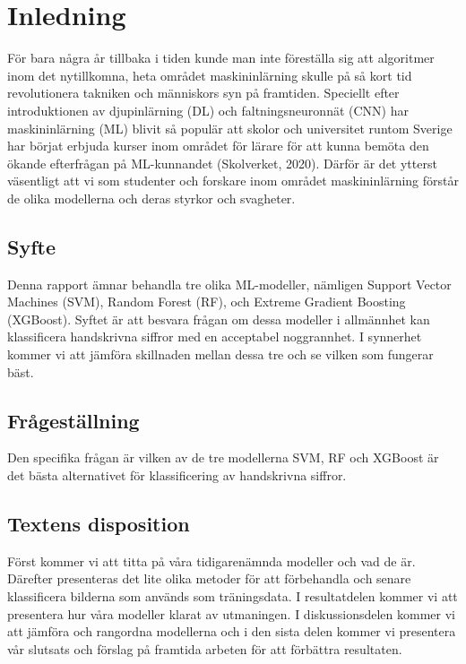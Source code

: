 \documentclass[12pt,a4paper]{article}
\begin{document}
\newpage

\section{Inledning}

För bara några år tillbaka i tiden kunde man inte föreställa sig att algoritmer inom det nytillkomna, heta området maskininlärning skulle på så kort tid revolutionera takniken och människors syn på framtiden. Speciellt efter introduktionen av djupinlärning (DL) och faltningsneuronnät (CNN) har maskininlärning (ML) blivit så populär att skolor och universitet runtom Sverige har börjat erbjuda kurser inom området för lärare för att kunna bemöta den ökande efterfrågan på ML-kunnandet (Skolverket, 2020). Därför är det ytterst väsentligt att vi som studenter och forskare inom området maskininlärning förstår de olika modellerna och deras styrkor och svagheter.

\subsection{Syfte}

Denna rapport ämnar behandla tre olika ML-modeller, nämligen Support Vector Machines (SVM), Random Forest (RF), och Extreme Gradient Boosting (XGBoost). Syftet är att besvara frågan om dessa modeller i allmännhet kan klassificera handskrivna siffror med en acceptabel noggrannhet. I synnerhet kommer vi att jämföra skillnaden mellan dessa tre och se vilken som fungerar bäst. 

\subsection{Frågeställning}

Den specifika frågan är vilken av de tre modellerna SVM, RF och XGBoost är det bästa alternativet för klassificering av handskrivna siffror.

\subsection{Textens disposition}

Först kommer vi att titta på våra tidigarenämnda modeller och vad de är. Därefter presenteras det lite olika metoder för att förbehandla och senare klassificera bilderna som används som träningsdata. I resultatdelen kommer vi att presentera hur våra modeller klarat av utmaningen. I diskussionsdelen kommer vi att jämföra och rangordna modellerna och i den sista delen kommer vi presentera vår slutsats och förslag på framtida arbeten för att förbättra resultaten.
\end{document}
